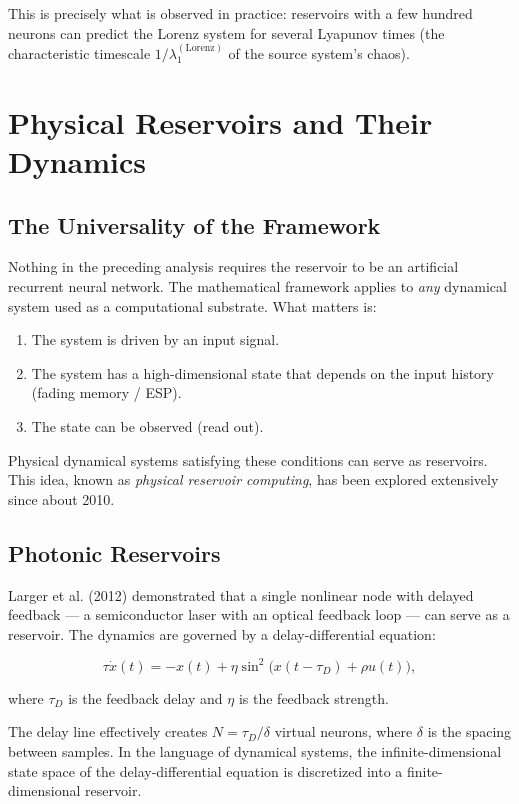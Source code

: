 This is precisely what is observed in practice: reservoirs with a few hundred neurons can predict the Lorenz system for several Lyapunov times (the characteristic timescale $1/\lambda_1^{(\text{Lorenz})}$ of the source system's chaos).


\bigskip


\section{Physical Reservoirs and Their Dynamics}\label{sec:16.6}

\subsection{The Universality of the Framework}\label{sec:16.6.1}

Nothing in the preceding analysis requires the reservoir to be an artificial recurrent neural network. The mathematical framework applies to \textit{any} dynamical system used as a computational substrate. What matters is:

\begin{enumerate}[nosep]
  \item The system is driven by an input signal.
  \item The system has a high-dimensional state that depends on the input history (fading memory / ESP).
  \item The state can be observed (read out).
\end{enumerate}

Physical dynamical systems satisfying these conditions can serve as reservoirs. This idea, known as \textit{physical reservoir computing}, has been explored extensively since about 2010.

\subsection{Photonic Reservoirs}\label{sec:16.6.2}

Larger et al. (2012) demonstrated that a single nonlinear node with delayed feedback --- a semiconductor laser with an optical feedback loop --- can serve as a reservoir. The dynamics are governed by a delay-differential equation:

\[
\tau \dot{x}(t) = -x(t) + \eta \sin^2\bigl(x(t - \tau_D) + \rho u(t)\bigr),
\]

where $\tau_D$ is the feedback delay and $\eta$ is the feedback strength.

The delay line effectively creates $N = \tau_D / \delta$ virtual neurons, where $\delta$ is the spacing between samples. In the language of dynamical systems, the infinite-dimensional state space of the delay-differential equation is discretized into a finite-dimensional reservoir.

